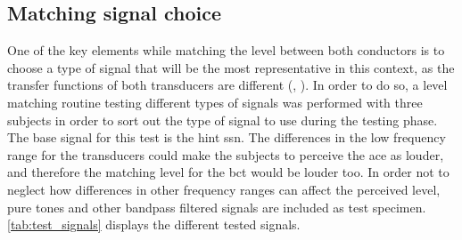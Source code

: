\subsection{Matching signal choice}
\label{sec:match_sig_cho}
One of the key elements while matching the level between both conductors is to choose a type of signal that will be the most representative in this context, as the transfer functions of both transducers are different (\citep{microPro_er4},  \citep{radioear_b81}). In order to do so, a level matching routine testing different types of signals was performed with three subjects in order to sort out the type of signal to use during the testing phase. The base signal for this test is the \matlab \gls{hint} \gls{ssn}. The differences in the low frequency range for the transducers could make the subjects to perceive the \gls{ace} as louder, and therefore the matching level for the \gls{bct} would be louder too. In order not to neglect how differences in other frequency ranges can affect the perceived level, pure tones and other bandpass filtered signals are included as test specimen. \autoref{tab:test_signals} displays the different tested signals.
